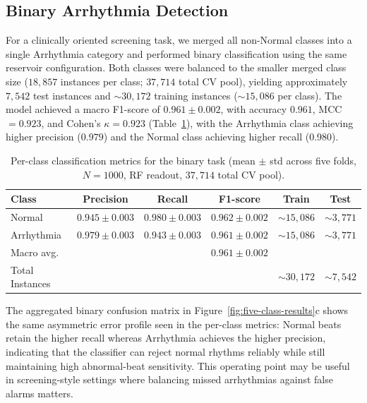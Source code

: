 \documentclass[journal=asbcd6,manuscript=article,keywords]{achemso}
\begin{document}
\subsection{Binary Arrhythmia Detection}

For a clinically oriented screening task, we merged all non-Normal classes into a single Arrhythmia category and performed binary classification using the same reservoir configuration. 
Both classes were balanced to the smaller merged class size ($18{,}857$ instances per class; $37{,}714$ total CV pool), yielding approximately $7{,}542$ test instances and ${\sim}30{,}172$ training instances (${\sim}15{,}086$ per class). 
The model achieved a macro F1-score of $0.961 \pm 0.002$, with accuracy $0.961$, MCC $= 0.923$, and Cohen's $\kappa = 0.923$ (Table~\ref{tab:binary-metrics}), with the Arrhythmia class achieving higher precision ($0.979$) and the Normal class achieving higher recall ($0.980$). 

\begin{table}
    \centering
    \caption{Per-class classification metrics for the binary task (mean $\pm$ std across five folds, $N = 1000$, RF readout, $37{,}714$ total CV pool).}
    \label{tab:binary-metrics}
    \small
    \begin{tabular}{lccccc}
        \toprule
        Class & Precision & Recall & F1-score & Train & Test \\
        \midrule
        Normal       & $0.945 \pm 0.003$ & $0.980 \pm 0.003$ & $0.962 \pm 0.002$ & ${\sim}15{,}086$ & ${\sim}3{,}771$ \\
        Arrhythmia   & $0.979 \pm 0.003$ & $0.943 \pm 0.003$ & $0.961 \pm 0.002$ & ${\sim}15{,}086$ & ${\sim}3{,}771$ \\
        \midrule
        Macro avg.   &       &       & $0.961 \pm 0.002$ & & \\
        Total Instances &       &       &                    & ${\sim}30{,}172$ & ${\sim}7{,}542$ \\
        \bottomrule
    \end{tabular}
\end{table}
 
The aggregated binary confusion matrix in Figure~\ref{fig:five-class-results}c shows the same asymmetric error profile seen in the per-class metrics: Normal beats retain the higher recall whereas Arrhythmia achieves the higher precision, indicating that the classifier can reject normal rhythms reliably while still maintaining high abnormal-beat sensitivity. 
This operating point may be useful in screening-style settings where balancing missed arrhythmias against false alarms matters.
\end{document}
